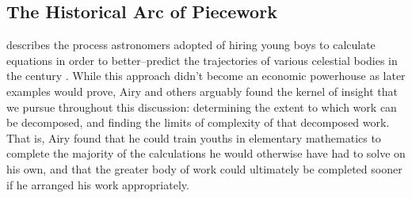 \documentclass[trackingWork]{subfiles}
\begin{document}



\subsection{The Historical Arc of Piecework}\label{sec:pieceworkArc}

\citeauthor{grier2013computers} describes the process astronomers adopted of hiring young boys
to calculate equations in order
to better--predict the trajectories of various celestial bodies in the  century
\cite{grier2013computers}.
While this approach didn't become an economic powerhouse as later examples would prove,
Airy and others arguably found the kernel of insight that we pursue throughout this discussion:
determining the extent to which work can be decomposed, and
finding the limits of complexity of that decomposed work.
That is, Airy found that he could train youths in elementary mathematics
to complete the majority of the calculations he would otherwise have had to solve on his own,
and that the greater body of work could ultimately be completed sooner
if he arranged his work appropriately.
\end{document}

